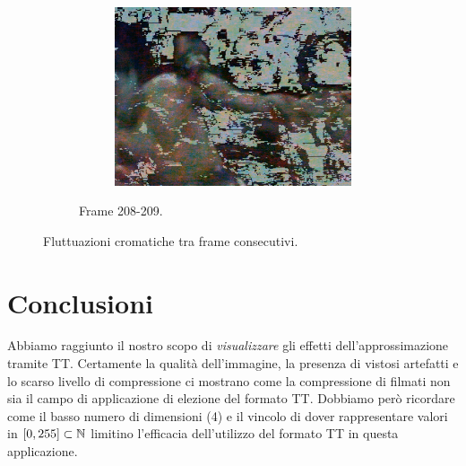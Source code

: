 \documentclass[11pt,a4paper]{article}
\begin{document}
\begin{figure}
\begin{subfigure}[]{\wid\textwidth}
    \begin{subfigure}[]{\wid\textwidth}
      \centering
      \includegraphics[keepaspectratio=true, scale=\scal]{Imgs/MuhammadAli/frame-209}
    \end{subfigure}
    \caption{Frame 208-209.}
  \end{subfigure}
  \caption{Fluttuazioni cromatiche tra frame consecutivi.}\label{fig:muhammadali_color_flickering}
\end{figure}

\section{Conclusioni}
Abbiamo raggiunto il nostro scopo di \emph{visualizzare} gli effetti dell'approssimazione tramite TT. Certamente la qualità dell'immagine, la presenza di vistosi artefatti e lo scarso livello di compressione ci mostrano come la compressione di filmati non sia il campo di applicazione di elezione del formato TT.
Dobbiamo però ricordare come il basso numero di dimensioni (4) e il vincolo di dover rappresentare valori in $[0,255]\subset\mathbb{N}$ limitino l'efficacia dell'utilizzo del formato TT in questa applicazione.

\end{document}
